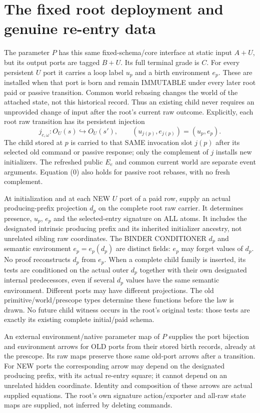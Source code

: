 \documentclass[11pt]{article}
\begin{document}
\section{The fixed root deployment and genuine re-entry data}
The parameter $P$ has this same fixed-schema/core interface at static input $A+U$, but its output ports are tagged $B+U$. Its full terminal grade is $C$. For every persistent $U$ port it carries a loop label $u_p$ and a birth environment $e_p$. These are installed when that port is born and remain IMMUTABLE under every later root paid or passive transition. Common world rebasing changes the world of the attached state, not this historical record. Thus an existing child never requires an unprovided change of input after the root's current raw outcome. Explicitly, each root raw transition has its persistent injection
\[
 j_{c,\omega}:O_U(s)\hookrightarrow O_U(s'),\qquad
 (u_{j(p)},e_{j(p)})=(u_p,e_p).                              \tag{0}
\]
The child stored at $p$ is carried to that SAME invocation slot $j(p)$ after its selected old command or passive response; only the complement of $j$ installs new initializers. The refreshed public $E_e$ and common current world are separate event arguments. Equation (0) also holds for passive root rebases, with no fresh complement.

At initialization and at each NEW $U$ port of a paid row, supply an actual producing-prefix projection $d_p$ on the complete root raw carrier. It determines presence, $u_p$, $e_p$ and the selected-entry signature on ALL atoms. It includes the designated intrinsic producing prefix and its inherited initializer ancestry, not unrelated sibling raw coordinates. The BINDER CONDITIONER $d_p$ and semantic environment $e_p=e_p(d_p)$ are distinct fields: $e_p$ may forget values of $d_p$. No proof reconstructs $d_p$ from $e_p$. When a complete child family is inserted, its tests are conditioned on the actual outer $d_p$ together with their own designated internal predecessors, even if several $d_p$ values have the same semantic environment. Different ports may have different projections. The old primitive/world/prescope types determine these functions before the law is drawn. No future child witness occurs in the root's original tests: those tests are exactly its existing complete initial/paid schema.

An external environment/native parameter map of $P$ supplies the port bijection and environment arrows for OLD ports from their stored birth records, already at the prescope. Its raw maps preserve those same old-port arrows after a transition. For NEW ports the corresponding arrow may depend on the designated producing prefix, with its actual re-entry square; it cannot depend on an unrelated hidden coordinate. Identity and composition of these arrows are actual supplied equations. The root's own signature action/exporter and all-raw state maps are supplied, not inferred by deleting commands.
\end{document}
